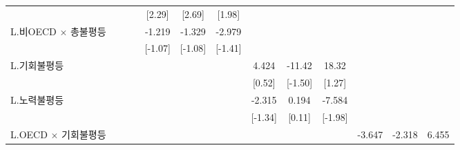 \begin{tabular}{l*{12}{c}}
                    &                     &                     &                     &      [2.29]         &      [2.69]         &      [1.98]         &                     &                     &                     &                     &                     &                     \\
\addlinespace
L.비OECD $\times$ 총불평등&                     &                     &                     &      -1.219         &      -1.329         &      -2.979         &                     &                     &                     &                     &                     &                     \\
                    &                     &                     &                     &     [-1.07]         &     [-1.08]         &     [-1.41]         &                     &                     &                     &                     &                     &                     \\
\addlinespace
L.기회불평등        &                     &                     &                     &                     &                     &                     &       4.424         &      -11.42         &       18.32         &                     &                     &                     \\
                    &                     &                     &                     &                     &                     &                     &      [0.52]         &     [-1.50]         &      [1.27]         &                     &                     &                     \\
\addlinespace
L.노력불평등        &                     &                     &                     &                     &                     &                     &      -2.315         &       0.194         &      -7.584\sym{**} &                     &                     &                     \\
                    &                     &                     &                     &                     &                     &                     &     [-1.34]         &      [0.11]         &     [-1.98]         &                     &                     &                     \\
\addlinespace
L.OECD $\times$ 기회불평등&                     &                     &                     &                     &                     &                     &                     &                     &                     &      -3.647         &      -2.318         &       6.455         \\

\end{tabular}
